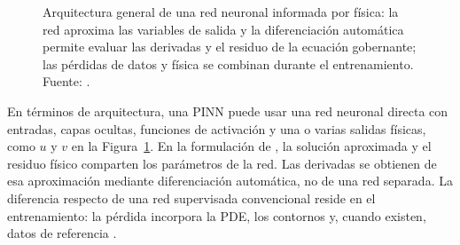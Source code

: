 \begin{figure}[H]
{%
}
\caption[Arquitectura general de una red neuronal informada por física]{Arquitectura general de una red neuronal informada por física: la red aproxima las variables de salida y la diferenciación automática permite evaluar las derivadas y el residuo de la ecuación gobernante; las pérdidas de datos y física se combinan durante el entrenamiento. Fuente: \textcite[fig.~1]{lawal2022}.}
\label{fig:arquitectura-pinn-lawal}
\end{figure}

En términos de arquitectura, una PINN puede usar una red neuronal directa con entradas, capas ocultas, funciones de activación y una o varias salidas físicas, como $u$ y $v$ en la Figura~\ref{fig:arquitectura-pinn-lawal}. En la formulación de \textcite[686--690]{raissi2019}, la solución aproximada y el residuo físico comparten los parámetros de la red. Las derivadas se obtienen de esa aproximación mediante diferenciación automática, no de una red separada. La diferencia respecto de una red supervisada convencional reside en el entrenamiento: la pérdida incorpora la PDE, los contornos y, cuando existen, datos de referencia \parencites[686--690]{raissi2019}[1--2,14--17]{lawal2022}.

